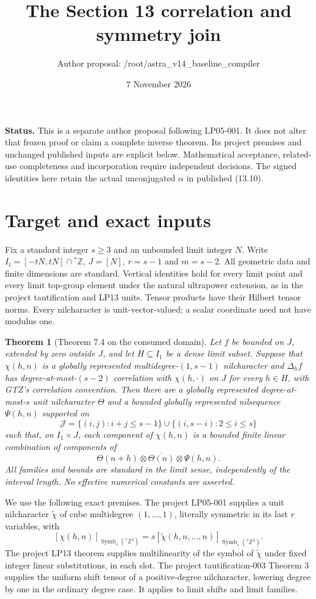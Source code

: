 \documentclass[11pt]{article}
\title{The Section 13 correlation and symmetry join}
\author{Author proposal: /root/astra\_v14\_baseline\_compiler}
\date{7 November 2026}
\newtheorem{theorem}{Theorem}
\newcommand{\Z}{\mathbb Z}\newcommand{\N}{\mathbb N}
\newcommand{\Symb}{\operatorname{Symb}}
\begin{document}
\maketitle
\noindent\textbf{Status.} This is a separate author proposal following
LP05-001. It does not alter that frozen proof or claim a complete inverse
theorem. Its project premises and unchanged published inputs are explicit
below. Mathematical acceptance, related-use completeness and incorporation
require independent decisions. The signed identities here retain the actual
unconjugated $\alpha$ in published (13.10).

\section{Target and exact inputs}
Fix a standard integer $s\geq3$ and an unbounded limit integer $N$.
Write $I_t=[-tN,tN]\cap{}^*\Z$, $J=[N]$, $r=s-1$ and $m=s-2$.
All geometric data and finite dimensions are standard. Vertical identities
hold for every limit point and every limit top-group element under the
natural ultrapower extension, as in the project tautification and LP13
units. Tensor products have their Hilbert tensor norms. Every nilcharacter
is unit-vector-valued; a scalar coordinate need not have modulus one.

\begin{theorem}[Theorem 7.4 on the consumed domain]\label{thm:target}
Let $f$ be bounded on $J$, extended by zero outside $J$, and let
$H\subseteq I_1$ be a dense limit subset. Suppose that $\chi(h,n)$ is
a globally represented multidegree-$(1,s-1)$ nilcharacter and
$\Delta_h f$ has degree-at-most-$(s-2)$ correlation with $\chi(h,\cdot)$
on $J$ for every $h\in H$, with GTZ's correlation convention.
Then there are a globally represented degree-at-most-$s$ unit nilcharacter
$\Theta$ and a bounded globally represented nilsequence $\Psi(h,n)$
supported on
\[
 \mathcal J=\{(i,j):i+j\leq s-1\}\cup\{(i,s-i):2\leq i\leq s\}
                                                        \tag{1}
\]
such that, on $I_1\times J$, each component of $\chi(h,n)$ is a bounded
finite linear combination of components of
\[
 \Theta(n+h)\otimes\overline{\Theta(n)}\otimes\Psi(h,n).  \tag{2}
\]
All families and bounds are standard in the limit sense, independently of
the interval length. No effective numerical constants are asserted.
\end{theorem}

We use the following exact premises.
The project LP05-001 supplies a unit nilcharacter $\widetilde\chi$ of
cube multidegree $(1,\ldots,1)$, literally symmetric in its last $r$
variables, with
\[
 [\chi(h,n)]_{\Symb_s({}^*\Z^2)}
       =s[\widetilde\chi(h,n,\ldots,n)]_{\Symb_s({}^*\Z^2)}. \tag{3}
\]
The project LP13 theorem supplies multilinearity of the symbol of
$\widetilde\chi$ under fixed integer linear substitutions, in each slot.
The project tautification-003 Theorem 3 supplies the uniform shift tensor
of a positive-degree nilcharacter, lowering degree by one in the ordinary
degree case. It applies to limit shifts and limit families.
\end{document}
